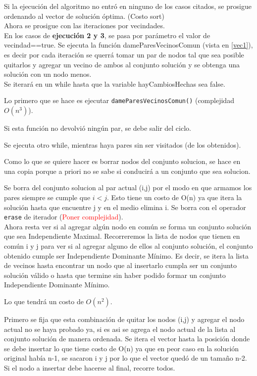 Si la ejecuci\'on del algoritmo no entr\'o en ninguno de los casos citados, se prosigue ordenando al vector de soluci\'on \'optima. (Costo sort)\\

Ahora se prosigue con las iteraciones por vecindades.\\

En los casos de \textbf{ejecuci\'on 2 y 3}, se pasa por par\'ametro el valor de vecindad==true. Se ejecuta la funci\'on dameParesVecinosComun (vista en \ref{vec1}), es decir por cada iteraci\'on se querr\'a tomar un par de nodos tal que sea posible quitarlos y agregar un vecino de ambos al conjunto soluci\'on y se obtenga una soluci\'on con un nodo menos.\\

Se iterar\'a en un while hasta que la variable hayCambiosHechas sea false.


Lo primero que se hace es ejecutar \texttt{dameParesVecinosComun()} (complejidad $O(n^3)$).

Si esta funci\'on no devolvi\'o ning\'un par, se debe salir del ciclo.

Se ejecuta otro while, mientras haya pares sin ser visitados (de los obtenidos).

Como lo que se quiere hacer es borrar nodos del conjunto solucion, se hace en una copia porque a priori no se sabe si conducir\'a a un conjunto que sea solucion. 

Se borra del conjunto solucion al par actual (i,j) por el modo en que armamos los pares siempre se cumple que $i<j$. Esto tiene un costo de O(n) ya que itera la soluci\'on hasta que encuentre j y en el medio elimina i. Se borra con el operador \texttt{erase} de iterador (\textcolor{red}{Poner complejidad}).\\

Ahora resta ver si al agregar alg\'un nodo en com\'un se forma un conjunto soluci\'on que sea Independiente Maximal. Recorreremos la lista de nodos que tienen en com\'un i y j para ver si al agregar alguno de ellos al conjunto soluci\'on, el conjunto obtenido cumple ser Independiente Dominante M\'inimo. Es decir, se itera la lista de vecinos hasta encontrar un nodo que al insertarlo cumpla ser un conjunto soluci\'on v\'alido o hasta que termine sin haber podido formar un conjunto Independiente Dominante M\'inimo.

 Lo que tendr\'a un costo de $O(n^2)$.

Primero se fija que esta combinaci\'on de quitar los nodos (i,j) y agregar el nodo actual no se haya probado ya, si es asi se agrega el nodo actual de la lista al conjunto soluci\'on de manera ordenada. Se itera el vector hasta la posici\'on donde se debe insertar lo que tiene costo de O(n) ya que en peor caso en la soluci\'on original hab\'ia n-1, se sacaron i y j por lo que el vector qued\'o de un tama\~	no n-2. Si el nodo a insertar debe hacerse al final, recorre todos.

